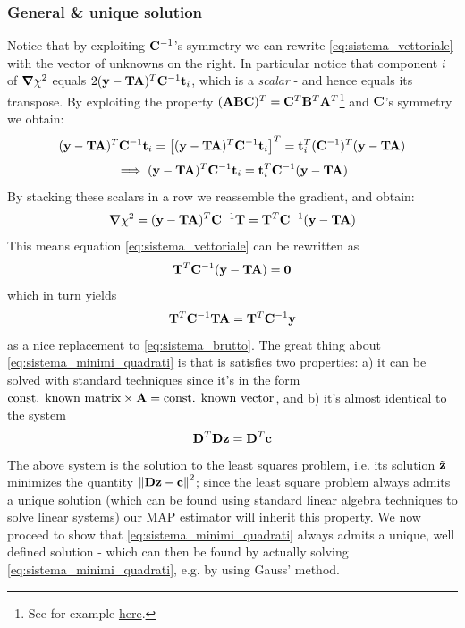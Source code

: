 \documentclass[a4paper]{article}
\newcommand{\mat}[1]{\vb{#1}}
\newcommand{\quadre}[1]{\left[ {#1} \right]}
\begin{document}
\subsubsection{General \& unique solution}
Notice that by exploiting $\mat{C}^{-1}$'s symmetry we can rewrite \eqref{eq:sistema_vettoriale} with the vector of unknowns on the right. In particular notice that component $i$ of $\grad\chi^2$ equals $2(\vb{y}-\mat{T}\vb{A})^T\mat{C}^{-1}\vb{t}_i$, which is a \emph{scalar} - and hence equals its transpose. By exploiting the property $(\mat{A}\mat{B}\mat{C})^T = \mat{C}^T\mat{B}^T\mat{A}^T$\footnote{See for example \hyperlink{https://math.stackexchange.com/a/795248}{here}.} and $\mat{C}$'s symmetry we obtain:
\begin{equation*}
    (\vb{y}-\mat{T}\vb{A})^T \mat{C}^{-1}\vb{t}_i = \quadre{(\vb{y}-\mat{T}\vb{A})^T \mat{C}^{-1}\vb{t}_i}^T = \vb{t}_i^T (\mat{C}^{-1})^T(\vb{y}-\mat{T}\vb{A})
\end{equation*}
\begin{equation*}
    \implies (\vb{y}-\mat{T}\vb{A})^T \mat{C}^{-1}\vb{t}_i = \vb{t}_i^T \mat{C}^{-1} (\vb{y}-\mat{T}\vb{A})
\end{equation*}
By stacking these scalars in a row we reassemble the gradient, and obtain:
\begin{equation*}
    \grad\chi^2 = (\vb{y}-\mat{T}\vb{A})^T \mat{C}^{-1}\mat{T} = \mat{T}^T \mat{C}^{-1} (\vb{y}-\mat{T}\vb{A})
\end{equation*}
This means equation \eqref{eq:sistema_vettoriale} can be rewritten as
\begin{equation*}
    \mat{T}^T \mat{C}^{-1} (\vb{y}-\mat{T}\vb{A}) = \vb{0}
\end{equation*}
which in turn yields
\begin{equation}
\label{eq:sistema_minimi_quadrati}
    \mat{T}^T \mat{C}^{-1} \mat{T}\vb{A} = \mat{T}^T \mat{C}^{-1}\vb{y}
\end{equation}
as a nice replacement to \eqref{eq:sistema_brutto}. The great thing about \eqref{eq:sistema_minimi_quadrati} is that is satisfies two properties: a) it can be solved with standard techniques since it's in the form $ \text{const. known matrix} \times \vb{A}= \text{const. known vector}$, and b) it's almost identical to the system
\begin{equation}
\label{eq:lsq}
    \mat{D}^T\mat{D}\vb{z} = \mat{D}^T\vb{c}
\end{equation}
The above system is the solution to the least squares problem, i.e. its solution $\Tilde{\vb{z}}$ minimizes the quantity $\norm{\mat{D}\vb{z}-\vb{c}}^2$; since the least square problem always admits a unique solution (which can be found using standard linear algebra techniques to solve linear systems) our MAP estimator will inherit this property. We now proceed to show that \eqref{eq:sistema_minimi_quadrati} always admits a unique, well defined solution - which can then be found by actually solving \eqref{eq:sistema_minimi_quadrati}, e.g. by using Gauss' method.\\
\end{document}
